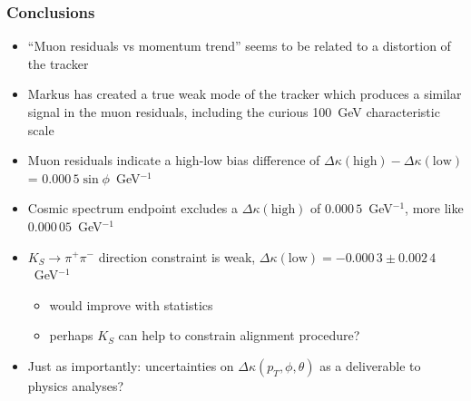 \documentclass[compress]{beamer}
\begin{document}

\begin{frame}
\frametitle{Conclusions}

\begin{itemize}\setlength{\itemsep}{0.1 cm}
\item ``Muon residuals vs momentum trend'' seems to be related to a
  distortion of the tracker

\item Markus has created a true weak mode of the tracker which
  produces a similar signal in the muon residuals, including the
  curious 100~GeV characteristic scale

\item Muon residuals indicate a high-low bias difference of $\Delta
  \kappa(\mbox{high}) - \Delta \kappa(\mbox{low})$ = $0.000\,5
  \sin\phi$~GeV$^{-1}$

\item Cosmic spectrum endpoint excludes a $\Delta \kappa(\mbox{high})$
  of $0.000\,5$~GeV$^{-1}$, more like $0.000\,05$~GeV$^{-1}$

\item $K_S \to \pi^+\pi^-$ direction constraint is weak, $\Delta
  \kappa(\mbox{low}) = -0.000\,3 \pm 0.002\,4$~GeV$^{-1}$
\begin{itemize}
\item would improve with statistics

\item perhaps $K_S$ can help to constrain alignment procedure?
\end{itemize}

\item Just as importantly: uncertainties on $\Delta \kappa(p_T, \phi, \theta)$ as a
  deliverable to physics analyses?
\end{itemize}

\label{numpages}
\end{frame}
\end{document}

